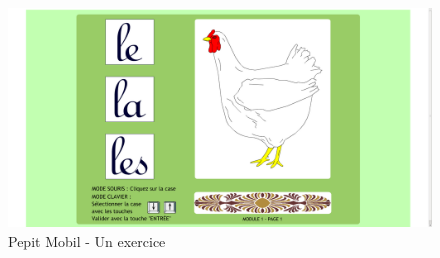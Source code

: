 \begin{figure}[H]
\begin{center}
\includegraphics[width=15cm]{images/pepit_be_practice}
\end{center}
\caption{Pepit Mobil - Un exercice}
\label{Pepit Mobil - Un exercice}
\end{figure}